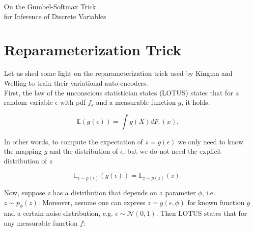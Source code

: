 \documentclass[11pt]{article}
\def\E{\mathbb{E}}
\def\eps{\epsilon}
\begin{document}
\begin{center}
	{\LARGE On the Gumbel-Softmax Trick\\[6pt] for Inference of Discrete Variables} 
\end{center}

\begin{abstract}
The reparameterization trick enables optimizing stochastic computation graphs via gradient descent. The essence of the trick is to re-factor each stochastic node into a differentiable function of its parameters and a random variable with fixed distribution. After refactoring, the gradients of the loss propagated by the chain rule through the graph are low variance unbiased estimators of the gradients of the expected loss. While many continuous random variables have such re-parameterizations, discrete random variables lack useful reparameterizations due to the discontinuous nature of discrete states. As a remedy, the gumbel soft-max trick (or concrete distribution) serves as a continuous relaxation of discrete random variables.
\end{abstract}

\section{Reparameterization Trick}

Let us shed some light on the reparameterization trick used by Kingma and Welling \cite{KingmaW13} to train their variational auto-encoders.\\

First, the law of the unconscious statistician states (LOTUS) states that for a random variable $\eps$ with pdf $f_\eps$ and a measurable function $g$, it holds:

\begin{equation}
\E(g(\eps)) = \int g(X) d F_\eps(x).
\end{equation}

In other words, to compute the expectation of $z = g(\eps)$ we only need to know the mapping $g$ and the distribution of $\epsilon$, but we do not need the explicit distribution of $z$

\begin{equation}
\E_{\eps\sim p(\eps)}(g(\eps)) = \E_{z\sim p(z)}(z).
\end{equation}

Now, suppose $z$ has a distribution that depends on a parameter $\phi$, i.e. $z\sim p_\phi (z)$. Moreover, assume one can express $z = g(\eps, \phi)$ for known function $g$ and a certain noise distribution, e.g. $\eps\sim\mathcal{N}(0,1)$. Then LOTUS states that for any measurable function $f$:
\end{document}
